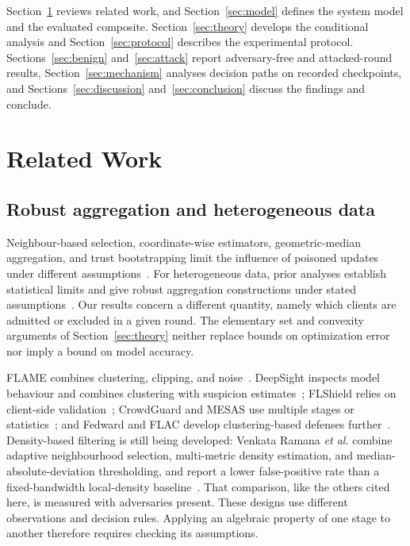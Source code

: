 \documentclass[journal]{IEEEtran}
\begin{document}
Section~\ref{sec:related} reviews related work, and Section~\ref{sec:model} defines the system model and the evaluated composite. Section~\ref{sec:theory} develops the conditional analysis and Section~\ref{sec:protocol} describes the experimental protocol. Sections~\ref{sec:benign} and~\ref{sec:attack} report adversary-free and attacked-round results, Section~\ref{sec:mechanism} analyses decision paths on recorded checkpoints, and Sections~\ref{sec:discussion} and~\ref{sec:conclusion} discuss the findings and conclude.

\section{Related Work}\label{sec:related}
\subsection{Robust aggregation and heterogeneous data}
Neighbour-based selection, coordinate-wise estimators, geometric-median aggregation, and trust bootstrapping limit the influence of poisoned updates under different assumptions~\cite{blanchard2017,yin2018,pillutla2022rfa,cao2021fltrust}. For heterogeneous data, prior analyses establish statistical limits and give robust aggregation constructions under stated assumptions~\cite{karimireddy2022bucketing,allouah2023mixing}. Our results concern a different quantity, namely which clients are admitted or excluded in a given round. The elementary set and convexity arguments of Section~\ref{sec:theory} neither replace bounds on optimization error nor imply a bound on model accuracy.

FLAME combines clustering, clipping, and noise~\cite{nguyen2022flame}. DeepSight inspects model behaviour and combines clustering with suspicion estimates~\cite{rieger2022deepsight}; FLShield relies on client-side validation~\cite{kabir2023flshield}; CrowdGuard and MESAS use multiple stages or statistics~\cite{rieger2024crowdguard,krauss2023mesas}; and Fedward and FLAC develop clustering-based defenses further~\cite{chen2023fedward,yuan2025flac}. Density-based filtering is still being developed: Venkata Ramana \emph{et al.} combine adaptive neighbourhood selection, multi-metric density estimation, and median-absolute-deviation thresholding, and report a lower false-positive rate than a fixed-bandwidth local-density baseline~\cite{ramana2026alldd}. That comparison, like the others cited here, is measured with adversaries present. These designs use different observations and decision rules. Applying an algebraic property of one stage to another therefore requires checking its assumptions.
\end{document}
